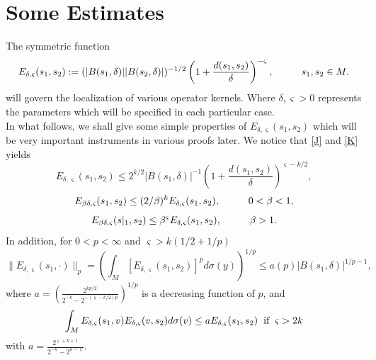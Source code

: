 \documentclass[10pt]{article}
\theoremstyle{definition}
\numberwithin{equation}{section}
\begin{document}
	
	\section{Some Estimates}
	The symmetric function
	\begin{equation}
		E_{\delta, \varsigma} (s_1,s_2) := (|B(s_1,\delta)||B(s_2,\delta)|)^{-1/2} \left(1 + \frac{d(s_1,s_2)}{\delta}\right)^{-\varsigma}, \hspace{1 cm} s_1,s_2 \in M.
	\end{equation}
	will govern the localization of various operator kernels.
	Where $\delta, \varsigma>0$ represents the parameters which will be specified in each particular case.\\
	In what follows, we shall give some simple properties of $E_{\delta, \varsigma} (s_1,s_2)$ which will be very important instruments
	in various proofs later. We notice that \eqref{J} and \eqref{K} yields
	\begin{equation}
		E_{\delta, \varsigma} (s_1,s_2) \leq 2^{k/2} |B(s_1, \delta)|^{-1} \left(1 + \frac{d(s_1,s_2)}{\delta}\right)^{\varsigma-k/2},
	\end{equation}
	\begin{equation}
		E_{\beta \delta, \varsigma} (s_1,s_2) \leq (2/\beta)^k E_{\delta, \varsigma} (s_1,s_2), \hspace{1 cm} 0<\beta<1,
	\end{equation}
	\begin{equation}
		E_{\beta \delta, \varsigma} (s|_1,s_2) \leq \beta^{\varsigma} E_{\delta, \varsigma} (s_1,s_2), \hspace{1 cm} \beta >1.
	\end{equation}
	In addition, for $0<p<\infty$ and $\varsigma >k(1/2 + 1/p) $
	\begin{equation}\label{O}
		\lVert E_{\delta, \varsigma} (s_1,\cdotp)\rVert_p = \left (\int_M [E_{\delta, \varsigma} (s_1,s_2)]^p d \sigma(y) \right)^{1/p} \leq a(p)|B(s_1, \delta)|^{1/p -1},
	\end{equation}
	where $ a = \left( \frac{2^{kp/2}}{2^{-k} - 2^{-(\varsigma - k/2)p}} \right)^{1/p}$ is a decreasing function of $p$, and
	\begin{equation}\label{Q}
		\int_M E_{\delta, \varsigma}(s_1,v)E_{\delta, \varsigma}(v,s_2)d\sigma (v) \leq aE_{\delta, \varsigma}(s_1,s_2) \hspace{0.2 cm}  \mbox{if} \hspace{0.2 cm} \varsigma>2k
	\end{equation}
	with $ a = \frac{2^{\varsigma + k + 1}}{2^{-k} - 2^{k-\varsigma}}$.\\
\end{document}
